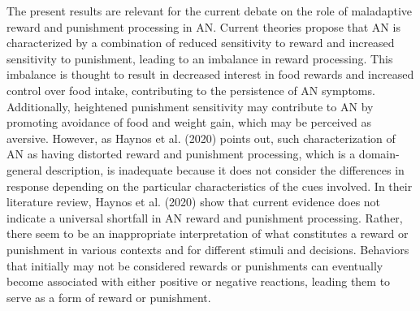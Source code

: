 \documentclass[
  man,floatsintext]{apa6}
\begin{document}
The present results are relevant for the current debate on the role of maladaptive reward and punishment processing in AN. Current theories propose that AN is characterized by a combination of reduced sensitivity to reward and increased sensitivity to punishment, leading to an imbalance in reward processing. This imbalance is thought to result in decreased interest in food rewards and increased control over food intake, contributing to the persistence of AN symptoms. Additionally, heightened punishment sensitivity may contribute to AN by promoting avoidance of food and weight gain, which may be perceived as aversive. However, as Haynos et al. (2020) points out, such characterization of AN as having distorted reward and punishment processing, which is a domain-general description, is inadequate because it does not consider the differences in response depending on the particular characteristics of the cues involved. In their literature review, Haynos et al. (2020) show that current evidence does not indicate a universal shortfall in AN reward and punishment processing. Rather, there seem to be an inappropriate interpretation of what constitutes a reward or punishment in various contexts and for different stimuli and decisions. Behaviors that initially may not be considered rewards or punishments can eventually become associated with either positive or negative reactions, leading them to serve as a form of reward or punishment.
\end{document}
